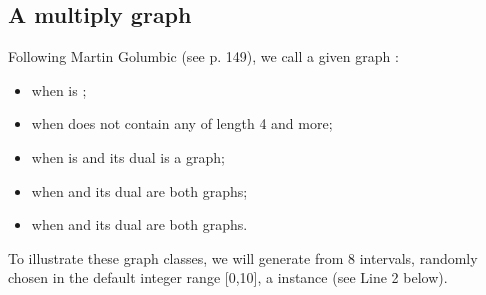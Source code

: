 \documentclass[a4paper,12pt,english]{sphinxhowto}
\begin{document}
\subsection{A multiply  graph}
\label{\detokenize{tutorial:a-multiply-perfect-graph}}
Following Martin Golumbic (see  p. 149), we call a given graph :
\begin{itemize}
\item {} 
 when   is ;

\item {} 
 when  does not contain any  of length 4 and more;

\item {} 
 when  is  and its dual  is a  graph;

\item {} 
 when  and its dual  are both  graphs;

\item {} 
 when  and its dual  are both  graphs.

\end{itemize}

To illustrate these  graph classes, we will generate from 8 intervals, randomly chosen in the default integer range {[}0,10{]}, a  instance  (see Line 2 below).
\end{document}
